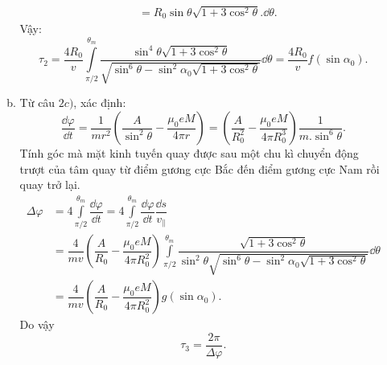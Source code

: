 \begin{loigiai}
\begin{enumerate}[1)]
\begin{enumerate}[a)]
\[\begin{aligned}
                &={{R}_{0}}\sin \theta \sqrt{1+3{{\cos }^{2}}\theta }.\dd\theta.
            \end{aligned}
             \]
            Vậy: 
            \[{{\tau }_{2}}=\dfrac{4{{R}_{0}}}{v}\int\limits_{\pi /2}^{{{\theta }_{m}}}{\dfrac{{{\sin }^{4}}\theta \sqrt{1+3{{\cos }^{2}}\theta }}{\sqrt{{{\sin }^{6}}\theta -{{\sin }^{2}}{{\alpha }_{0}}\sqrt{1+3{{\cos }^{2}}\theta }}}\dd\theta }=\dfrac{4{{R}_{0}}}{v}f\left( \sin {{\alpha }_{0}} \right).\]
            \item Từ câu $2c)$, xác định: 
            \[\dfrac{\dd\varphi }{\dd t}=\dfrac{1}{m{{r}^{2}}}\left( \dfrac{A}{{{\sin }^{2}}\theta }-\dfrac{{{\mu }_{0}}eM}{4\pi r} \right)=\left( \dfrac{A}{R_{0}^{2}}-\dfrac{{{\mu }_{0}}eM}{4\pi R_{0}^{3}} \right)\dfrac{1}{m.{{\sin }^{6}}\theta }.\]
            Tính góc mà mặt kinh tuyến quay được sau một chu kì chuyển động trượt của tâm quay từ điểm gương cực Bắc đến điểm gương cực Nam rồi quay trở lại.
            \[\begin{aligned}
              \Delta \varphi &= 4\int\limits_{\pi /2}^{{\theta _m}} {\dfrac{{\dd\varphi }}{{\dd t}}}  = 4\int\limits_{\pi /2}^{{\theta _m}} {\dfrac{{\dd\varphi }}{{\dd t}}\dfrac{{\dd{{s}}}}{{{v_{\parallel}}}}}\\
              &=\dfrac{4}{{mv}}\left( {\dfrac{A}{{{R_0}}} - \dfrac{{{\mu _0}eM}}{{4\pi R_0^2}}} \right)\int\limits_{\pi /2}^{{\theta _m}} {\dfrac{{\sqrt {1 + 3{{\cos }^2}\theta } }}{{{{\sin }^2}\theta \sqrt {{{\sin }^6}\theta  - {{\sin }^2}{\alpha _0}\sqrt {1 + 3{{\cos }^2}\theta } } }}\dd\theta } \\
              &=\dfrac{4}{{mv}}\left( {\dfrac{A}{{{R_0}}} - \dfrac{{{\mu _0}eM}}{{4\pi R_0^2}}} \right)g\left( {\sin {\alpha _0}} \right).
            \end{aligned}\]
                Do vậy 
                \[{{\tau }_{3}}=\dfrac{2\pi }{\Delta \varphi }.\]

        \end{enumerate}
    \end{enumerate}
\end{loigiai}


